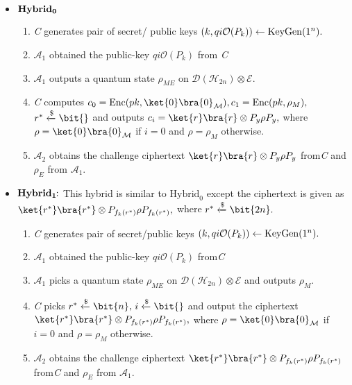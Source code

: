 \begin{itemize}
\item ${\bf Hybrid_0}$
\begin{enumerate}
\item {\em C} generates pair of secret/ public keys $(k, qi\mathcal{O}(P_k)) \leftarrow{\rm KeyGen}(1^n).$
\item $\mathcal{A}_1$ obtained the public-key $qi\mathcal{O}(P_k)$ from {\em C}
\item $\mathcal{A}_1$ outputs a quantum state  $\rho_{ME}$ on  $\mathcal{D}(\mathcal{H}_{2n}) \otimes \mathcal{E}.$
\item {\em C} computes $c_0={\rm Enc}(pk,\ket{0}\bra{0}_\mathcal{M}), c_1={\rm Enc}(pk,\rho_M),$ $r^* \xleftarrow[]{\$} \bit{}$ and outputs $c_i=\ket{r}\bra{r} \otimes P_y \rho P_y,$ where $\rho=\ket{0}\bra{0}_\mathcal{M}$ if $i=0$ and  $\rho=\rho_M$ otherwise.
\item  $\mathcal{A}_2$ obtains the challenge ciphertext $\ket{r}\bra{r} \otimes P_y \rho P_y$ from{\em C} and $\rho_E$ from $\mathcal{A}_1.$
\end{enumerate}
\end{itemize}

\begin{itemize}
\item${\bf Hybrid_1} \hspace{-0.12cm}:$ This hybrid is similar to $\mbox{Hybrid}_0$ except the ciphertext is given as $\ket{r^*}\bra{r^*} \otimes P_{f_k(r^*)} \rho P_{f_k(r^*)},$ where $r^* \xleftarrow[]{\$} \bit{2n}.$
\begin{enumerate}
\item {\em C} generates pair of secret/public keys $(k, qi\mathcal{O}(P_k)) \leftarrow{\rm KeyGen}(1^n).$
\item $\mathcal{A}_1$ obtained the public-key $qi\mathcal{O}(P_k)$ from{\em C}
\item $\mathcal{A}_1$ picks a quantum state  $\rho_{ME}$ on  $\mathcal{D}(\mathcal{H}_{2n}) \otimes \mathcal{E}$ and outputs $\rho_{M}.$
\item{\em C} picks $r^* \xleftarrow[]{\$} \bit{n},\, i \xleftarrow[]{\$} \bit{}$  and output the ciphertext $\ket{r^*}\bra{r^*} \otimes P_{f_k(r^*)} \rho P_{f_k(r^*)},$ where $\rho=\ket{0}\bra{0}_\mathcal{M}$ if $i=0$ and  $\rho=\rho_M$ otherwise.
\item  $\mathcal{A}_2$ obtains the challenge ciphertext $\ket{r^*}\bra{r^*} \otimes P_{f_k(r^*)} \rho P_{f_k(r^*)}$ from{\em C} and $\rho_E$ from $\mathcal{A}_1.$
\end{enumerate}
\end{itemize}



